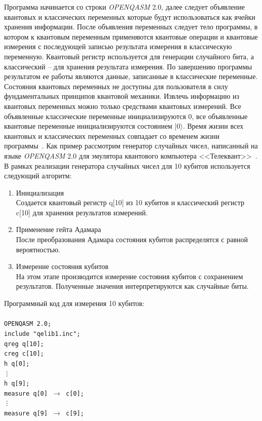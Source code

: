 \documentclass[12pt,a4paper]{article}
\begin{document}
	Программа начинается со строки \textit{OPENQASM} 2.0, далее следует объявление квантовых и классических переменных которые будут использоваться как ячейки хранения информации. После объявления переменных следует тело программы, в котором к квантовым переменным применяются квантовые операции и квантовые измерения с последующей записью результата измерения в классическую переменную. Квантовый регистр используется для генерации случайного бита, а классический -- для хранения результата измерения. По завершению программы результатом ее работы являются данные, записанные в классические переменные. Состояния квантовых переменных не доступны для пользователя в силу фундаментальных принципов квантовой механики. Извлечь информацию из квантовых переменных можно только средствами квантовых измерений. Все объявленные классические переменные инициализируются $0$, все объявленные квантовые переменные инициализируются состоянием |0$\rangle$. Время жизни всех квантовых и классических переменных совпадает со временем жизни программы~\cite{Telequant}.
	Как пример рассмотрим генератор случайных чисел, написанный на языке \textit{OPENQASM} 2.0 для эмулятора квантового компьютера <<Телеквант>>~\cite{Telequant}. В рамках реализации генератора случайных чисел для 10 кубитов используется следующий алгоритм:
	\begin{enumerate}
		\item Инициализация \\
		Создается квантовый регистр q[10] из 10 кубитов и классический регистр c[10] для хранения результатов измерений.
		\item Применение гейта Адамара \\
		После преобразования Адамара состояния кубитов распределятся с равной вероятностью.
		\item Измерение состояния кубитов \\
		На этом этапе производится измерение состояния кубитов с сохранением результатов. Полученные значения интерпретируются как случайные биты.
	\end{enumerate}
	Программный код для измерения 10 кубитов: \\\\
	\texttt{OPENQASM 2.0;\\
		include "qelib1.inc";\\
		qreg q[10];\\
		creg c[10];\\
		h q[0];\\
		\vdots \\
		h q[9];\\
		measure q[0] $\rightarrow$ c[0];\\
		\vdots \\
		measure q[9] $\rightarrow$ c[9];\\}
	
\end{document}

